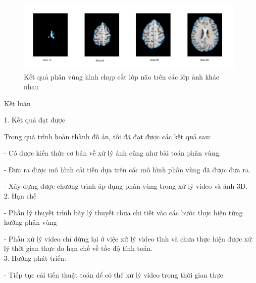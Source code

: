\documentclass[14pt,oneside,a4paper]{extreport}
\begin{document}
\begin{center}
\begin{figure}
\includegraphics[scale=0.5]{figure/brainslice1.png}
\caption{Kết quả phân vùng hình chụp cắt lớp não trên các lớp ảnh khác nhau}
\end{figure}
\end{center}
\newpage
\begin{center}
\begin{huge}
Kết luận
\end{huge}
\end{center}
1. Kết quả đạt được

Trong quá trình hoàn thành đồ án, tôi đã đạt được các kết quả sau:

- Có được kiến thức cơ bản về xử lý ảnh cũng như bài toán phân vùng.

- Đưa ra được mô hình cải tiến dựa trên các mô hình phân vùng đã được đưa ra.

- Xây dựng được chương trình áp dụng phân vùng trong xử lý video và ảnh 3D.\\
2. Hạn chế

- Phần lý thuyết trình bày lý thuyết chưa chi tiết vào các bước thực hiện từng hướng phân vùng

- Phần xử lý video chỉ dừng lại ở việc xử lý video tĩnh và chưa thực hiện được xử lý thời gian thực do hạn chế về tốc độ tính toán.\\
3. Hướng phát triển:

- Tiếp tục cải tiến thuật toán để có thể xử lý video trong thời gian thực
\end{document}
